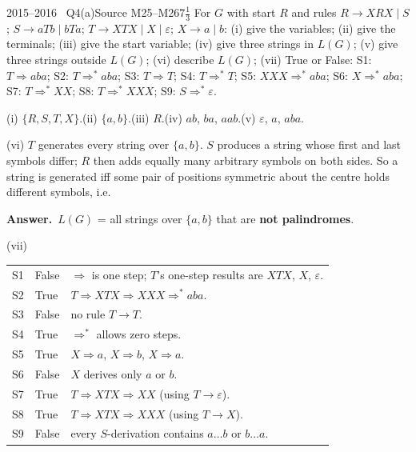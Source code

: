 \documentclass[11pt,a4paper]{article}
\newcommand{\eps}{\varepsilon}
\newcommand{\ans}[1]{\par\smallskip\noindent\colorbox{mist}{\parbox{\dimexpr\linewidth-2\fboxsep}{\sffamily\small\textbf{\color{teal}Answer.}\ \color{ink}#1}}\par}
\begin{document}
\begin{question}{2015--2016 \textbullet\ Q4(a)}{Source M25--M26}{7$\tfrac13$}
For $G$ with start $R$ and rules $R\to XRX\mid S$; $S\to aTb\mid bTa$; $T\to XTX\mid X\mid\eps$; $X\to a\mid b$:
(i) give the variables; (ii) give the terminals; (iii) give the start variable; (iv) give three strings in $L(G)$; (v) give three strings outside $L(G)$; (vi) describe $L(G)$; (vii) True or False:
S1: $T\Rightarrow aba$; S2: $T\Rightarrow^*aba$; S3: $T\Rightarrow T$; S4: $T\Rightarrow^*T$; S5: $XXX\Rightarrow^*aba$; S6: $X\Rightarrow^*aba$; S7: $T\Rightarrow^*XX$; S8: $T\Rightarrow^*XXX$; S9: $S\Rightarrow^*\eps$.
\end{question}
\begin{solution}
(i) $\{R,S,T,X\}$.\quad (ii) $\{a,b\}$.\quad (iii) $R$.\quad (iv) $ab$, $ba$, $aab$.\quad (v) $\eps$, $a$, $aba$.

(vi) $T$ generates every string over $\{a,b\}$. $S$ produces a string whose first and last symbols differ; $R$ then adds equally many arbitrary symbols on both sides. So a string is generated iff some pair of positions symmetric about the centre holds different symbols, i.e.
\ans{$L(G)$ = all strings over $\{a,b\}$ that are \textbf{not palindromes}.}
(vii)
\begin{center}\small\begin{tabular}{llp{9.5cm}}\toprule
S1&False& $\Rightarrow$ is one step; $T$'s one-step results are $XTX$, $X$, $\eps$.\\
S2&True& $T\Rightarrow XTX\Rightarrow XXX\Rightarrow^* aba$.\\
S3&False& no rule $T\to T$.\\
S4&True& $\Rightarrow^*$ allows zero steps.\\
S5&True& $X\Rightarrow a$, $X\Rightarrow b$, $X\Rightarrow a$.\\
S6&False& $X$ derives only $a$ or $b$.\\
S7&True& $T\Rightarrow XTX\Rightarrow XX$ (using $T\to\eps$).\\
S8&True& $T\Rightarrow XTX\Rightarrow XXX$ (using $T\to X$).\\
S9&False& every $S$-derivation contains $a\ldots b$ or $b\ldots a$.\\\bottomrule\end{tabular}\end{center}
\end{solution}
\end{document}
